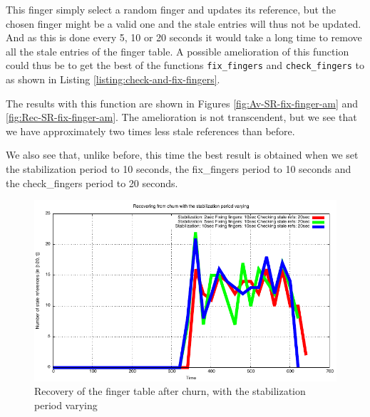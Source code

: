 \documentclass[a4paper, 11pt]{article}
\theoremstyle{plain}
\theoremstyle{definition}
\begin{document}
    

    This finger simply select a random finger and updates its reference, but the chosen finger might be a
    valid one and the stale entries will thus not be updated. And as this is done every 5, 10 or 20 seconds it
    would take a long time to remove all the stale entries of the finger table. A possible amelioration of
    this function could thus be to get the best of the functions \texttt{fix\_fingers} and
    \texttt{check\_fingers} to as shown in Listing \ref{listing:check-and-fix-fingers}.

    The results with this function are shown in Figures \ref{fig:Av-SR-fix-finger-am} and
    \ref{fig:Rec-SR-fix-finger-am}. The amelioration is not transcendent, but we see that we have
    approximately two times less stale references than before. \newpage

        


    We also see that, unlike before, this time the best result is obtained when we set the stabilization
    period to 10 seconds, the fix\_fingers period to 10 seconds and the check\_fingers period to 20 seconds. 

    \begin{figure}[h]
      \centering
      \includegraphics{plots/Recovery-SR-stabilization.pdf}
      \caption{Recovery of the finger table after churn, with the stabilization period varying}
      \label{fig:Rec-SR-stab}
    \end{figure}
    
\end{document}
